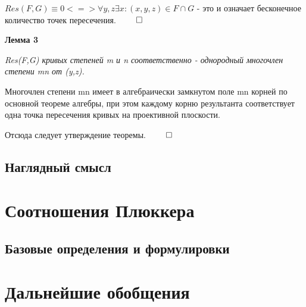 \documentclass[a4paper, 12pt]{article}
\begin{document}
$Res(F,G) \equiv 0 <=> \forall y,z \exists x: (x,y,z) \in F \cap G$ - это и означает бесконечное количество точек пересечения. $\qed$

\textbf{Лемма 3}

\textit{Res(F,G) кривых степеней m и n соответственно - однородный многочлен степени mn от (y,z).}


Многочлен степени mn имеет в алгебраически замкнутом поле mn корней по основной теореме алгебры, при этом каждому корню результанта соответствует одна точка пересечения кривых на проективной плоскости.

Отсюда следует утверждение теоремы. $\qed$

\subsection{Наглядный смысл} %

\section{Соотношения Плюккера}
\subsection{Базовые определения и формулировки}
\section{Дальнейшие обобщения}
\end{document}
